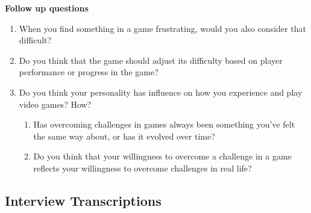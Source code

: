 \textbf{Follow up questions}
\begin{enumerate}
    \item When you find something in a game frustrating, would you also consider that difficult?
    \item Do you think that the game should adjust its difficulty based on player performance or progress in the game?
    \item Do you think your personality has influence on how you experience and play video games? How?
    \begin{enumerate}
        \item Has overcoming challenges in games always been something you’ve felt the same way about, or has it evolved over time?
        \item Do you think that your willingness to overcome a challenge in a game reflects your willingness to overcome challenges in real life?
    \end{enumerate}
\end{enumerate}

\subsection{Interview Transcriptions}


